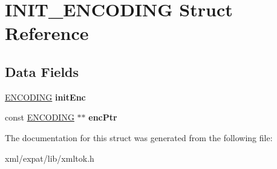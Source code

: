 \hypertarget{struct_i_n_i_t___e_n_c_o_d_i_n_g}{\section{I\-N\-I\-T\-\_\-\-E\-N\-C\-O\-D\-I\-N\-G Struct Reference}
\label{struct_i_n_i_t___e_n_c_o_d_i_n_g}
}
\subsection*{Data Fields}
\begin{DoxyCompactItemize}
\item 
\hypertarget{struct_i_n_i_t___e_n_c_o_d_i_n_g_af315cfdb5c933b05fdc0523f4d591221}{\hyperlink{structencoding}{E\-N\-C\-O\-D\-I\-N\-G} {\bfseries init\-Enc}}\label{struct_i_n_i_t___e_n_c_o_d_i_n_g_af315cfdb5c933b05fdc0523f4d591221}

\item 
\hypertarget{struct_i_n_i_t___e_n_c_o_d_i_n_g_a88e7b26311a762f388a855e3fbc794f3}{const \hyperlink{structencoding}{E\-N\-C\-O\-D\-I\-N\-G} $\ast$$\ast$ {\bfseries enc\-Ptr}}\label{struct_i_n_i_t___e_n_c_o_d_i_n_g_a88e7b26311a762f388a855e3fbc794f3}

\end{DoxyCompactItemize}


The documentation for this struct was generated from the following file\-:\begin{DoxyCompactItemize}
\item 
xml/expat/lib/xmltok.\-h\end{DoxyCompactItemize}
